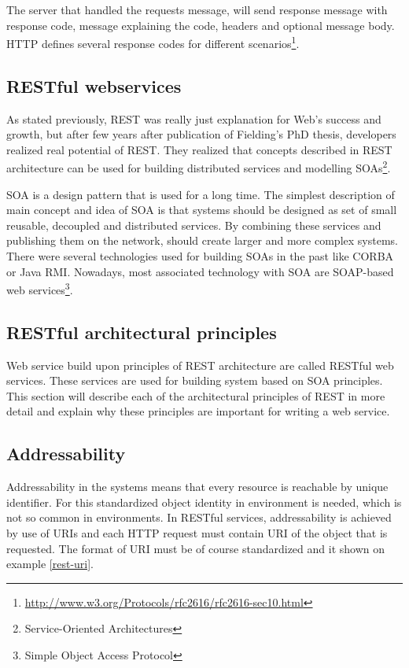 \documentclass[12pt,final,oneside]{fithesis2}
\begin{document}
The server that handled the requests message, will send response message with response code, message explaining the code, headers and optional message body. HTTP defines several response codes for different scenarios\footnote{\url{http://www.w3.org/Protocols/rfc2616/rfc2616-sec10.html}}.\cite{resteasy-book}

\subsection{RESTful webservices}
As stated previously, REST was really just explanation for Web's success and growth, but after few years after publication of Fielding's PhD thesis, developers realized real potential of REST. They realized that concepts described in REST architecture can be used for building distributed services and modelling SOAs\footnote{Service-Oriented Architectures}. 

SOA is a design pattern that is used for a long time. The simplest description of main concept and idea of SOA is that systems should be designed as set of small reusable, decoupled and distributed services. By combining these services and publishing them on the network, should create larger and more complex systems. There were several technologies used for building SOAs in the past like CORBA or Java RMI. Nowadays, most associated technology with SOA are SOAP-based web services\footnote{Simple Object Access Protocol}.  


\subsection{RESTful architectural principles}
Web service build upon principles of REST architecture are called RESTful web services. These services are used for building system based on SOA principles. This section will describe each of the architectural principles of REST in more detail and explain why these principles are important for writing a web service.


\subsection*{Addressability}
Addressability in the systems means that every resource is reachable by unique identifier. For this standardized object identity in environment is needed, which is not so common in environments. In RESTful services, addressability is achieved by use of URIs and each HTTP request must contain URI of the object that is requested. The format of URI must be of course standardized and it shown on example \ref{rest-uri}.
\end{document}
